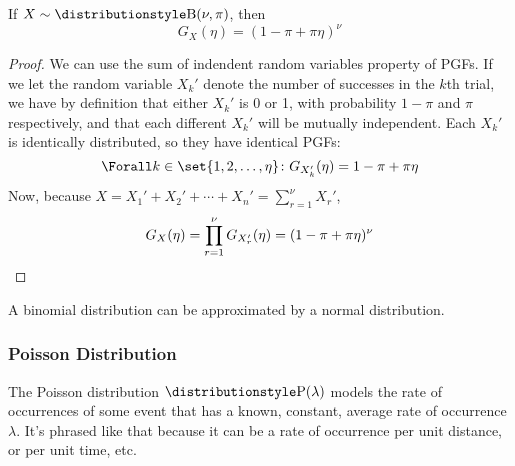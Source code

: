 \begin{lemma} \label{lem_binom_pgf}
 If \(X \sim \Binomial(\nu, \pi)\), then
 \begin{equation*}
 G_X(\eta) = (1 - \pi + \pi \eta)^\nu
 \end{equation*}
\end{lemma}
\begin{proof}
 We can use the sum of indendent random variables property of PGFs. If we let the
 random variable \(X_k'\) denote the number of successes in the \(k\)th trial, we
 have by definition that either \(X_k'\) is 0 or 1, with probability \(1 - \pi\)
 and \(\pi\) respectively, and that each different \(X_k'\) will be mutually
 independent. Each \(X_k'\) is identically distributed, so they have identical
 PGFs:
 \begin{equation*}
  \Forall k \in \set{1, 2, \dotsc, \eta} \colon
   G_{X_k'}(\eta) = 1 - \pi + \pi \eta
 \end{equation*}
 Now, because \(X = X_1' + X_2' + \dotsb + X_n' = \sum_{r = 1}^\nu X_r'\),
 \begin{equation*}
  G_X(\eta) = \prod_{r = 1}^\nu G_{X_r'}(\eta)
      = (1 - \pi + \pi \eta)^\nu \qedhere
 \end{equation*}
\end{proof}

A binomial distribution can be approximated by a normal distribution.

\subsubsection{Poisson Distribution}

The Poisson distribution \(\Poisson(\lambda)\) models the rate of occurrences of
some event that has a known, constant, average rate of occurrence \(\lambda\).
It's phrased like that because it can be a rate of occurrence per unit distance,
or per unit time, etc.

